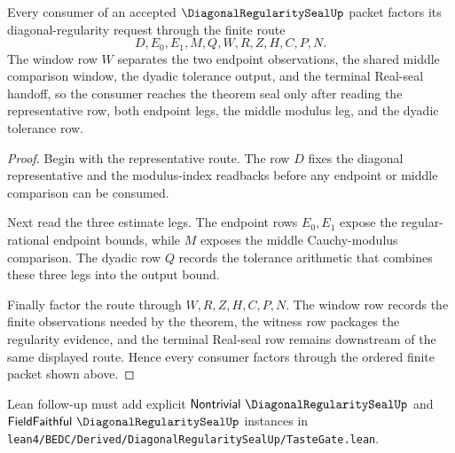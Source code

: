 \begin{theorem}
\label{thm:diagonal-regularity-seal-window-factorization}
Every consumer of an accepted $\DiagonalRegularitySealUp$ packet factors its diagonal-regularity request through the finite route
$$
D,E_0,E_1,M,Q,W,R,Z,H,C,P,N.
$$
The window row $W$ separates the two endpoint observations, the shared middle comparison window, the dyadic tolerance output, and the terminal Real-seal handoff, so the consumer reaches the theorem seal only after reading the representative row, both endpoint legs, the middle modulus leg, and the dyadic tolerance row.
\end{theorem}
\begin{proof}
Begin with the representative route. The row $D$ fixes the diagonal representative and the modulus-index readbacks before any endpoint or middle comparison can be consumed.

Next read the three estimate legs. The endpoint rows $E_0,E_1$ expose the regular-rational endpoint bounds, while $M$ exposes the middle Cauchy-modulus comparison. The dyadic row $Q$ records the tolerance arithmetic that combines these three legs into the output bound.

Finally factor the route through $W,R,Z,H,C,P,N$. The window row records the finite observations needed by the theorem, the witness row packages the regularity evidence, and the terminal Real-seal row remains downstream of the same displayed route. Hence every consumer factors through the ordered finite packet shown above.
\end{proof}



Lean follow-up must add explicit $\mathsf{Nontrivial}\ \DiagonalRegularitySealUp$ and $\mathsf{FieldFaithful}\ \DiagonalRegularitySealUp$ instances in \texttt{lean4/BEDC/Derived/DiagonalRegularitySealUp/TasteGate.lean}.


